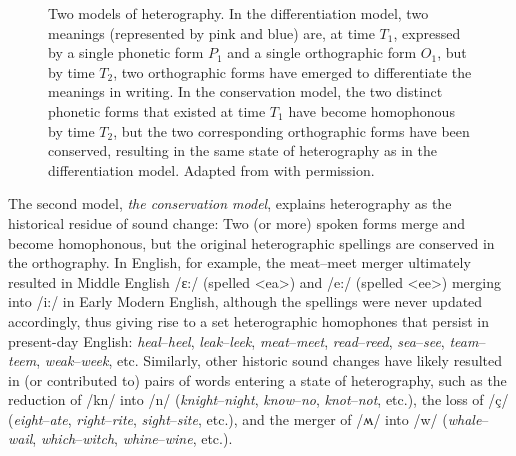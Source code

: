 \documentclass[doc,biblatex]{apa7}
\begin{document}
	\begin{figure}
	\vspace*{2pt}
	\caption{Two models of heterography. In the differentiation model, two meanings (represented by pink and blue) are, at time $T_1$, expressed by a single phonetic form $P_1$ and a single orthographic form $O_1$, but by time $T_2$, two orthographic forms have emerged to differentiate the meanings in writing. In the conservation model, the two distinct phonetic forms that existed at time $T_1$ have become homophonous by time $T_2$, but the two corresponding orthographic forms have been conserved, resulting in the same state of heterography as in the differentiation model. Adapted from \textcite[pp.~325--326]{Berg:2021} with permission.}
	\label{models_of_heterography}
	\end{figure}

The second model, \textit{the conservation model}, explains heterography as the historical residue of sound change: Two (or more) spoken forms merge and become homophonous, but the original heterographic spellings are conserved in the orthography. In English, for example, the meat--meet merger ultimately resulted in Middle English /ɛ:/ (spelled <ea>) and /e:/ (spelled <ee>) merging into /i:/ in Early Modern English, although the spellings were never updated accordingly, thus giving rise to a set heterographic homophones that persist in present-day English: \textit{heal}--\textit{heel}, \textit{leak}--\textit{leek}, \textit{meat}--\textit{meet}, \textit{read}--\textit{reed}, \textit{sea}--\textit{see}, \textit{team}--\textit{teem}, \textit{weak}--\textit{week}, etc. Similarly, other historic sound changes have likely resulted in (or contributed to) pairs of words entering a state of heterography, such as the reduction of /kn/ into /n/ (\textit{knight}--\textit{night}, \textit{know}--\textit{no}, \textit{knot}--\textit{not}, etc.), the loss of /ç/ (\textit{eight}--\textit{ate}, \textit{right}--\textit{rite}, \textit{sight}--\textit{site}, etc.), and the merger of /ʍ/ into /w/ (\textit{whale}--\textit{wail}, \textit{which}--\textit{witch}, \textit{whine}--\textit{wine}, etc.).
\end{document}
